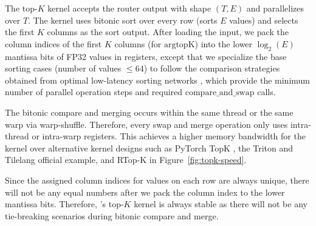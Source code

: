 The top-$K$ kernel accepts the router output with shape $(T, E)$ and parallelizes over $T$. The kernel uses bitonic sort \citep{bitonicsort} over every row (sorts $E$ values) and selects the first $K$ columns as the sort output. After loading the input, we pack the column indices of the first $K$ columns (for $\mathrm{argtopK}$) into the lower $\log_2(E)$ mantissa bits of FP32 values in registers, except that we specialize the base sorting cases (number of values $\leq 64$) to follow the comparison strategies obtained from optimal low-latency sorting networks \citep{sorting}, which provide the minimum number of parallel operation steps and required $\mathrm{compare\_and\_swap}$ calls. 




The bitonic compare and merging occurs within the same thread or the same warp via warp-shuffle. Therefore, every swap and merge operation only uses intra-thread or intra-warp registers. This achieves a higher memory bandwidth for the kernel over alternative kernel designs such as PyTorch TopK \citep{paszke2019pytorchimperativestylehighperformance}, the Triton \citep{triton} and Tilelang \citep{wang2025tilelang} official example, and RTop-K \citep{xie2025rtopk} in Figure~\ref{fig:topk-speed}.

Since the assigned column indices for values on each row are always unique, there will not be any equal numbers after we pack the column index to the lower mantissa bits. Therefore, \Algname's top-$K$ kernel is always stable as there will not be any tie-breaking scenarios during bitonic compare and merge.


